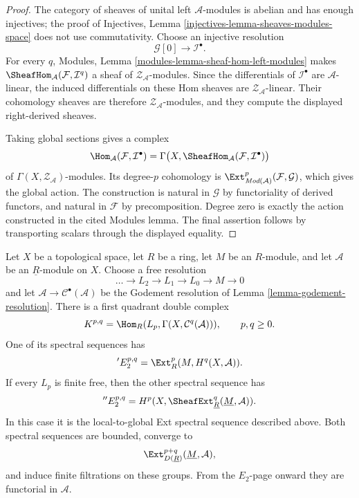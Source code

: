\begin{proof}
The category of sheaves of unital left $\mathcal A$-modules is abelian and
has enough injectives; the proof of Injectives, Lemma
\ref{injectives-lemma-sheaves-modules-space} does not use commutativity.
Choose an injective resolution
\[
\mathcal G[0]\longrightarrow\mathcal I^\bullet.
\]
For every $q$, Modules, Lemma
\ref{modules-lemma-sheaf-hom-left-modules} makes
$\SheafHom_{\mathcal A}(\mathcal F,\mathcal I^q)$ a sheaf of
$\mathcal Z_{\mathcal A}$-modules. Since the differentials of
$\mathcal I^\bullet$ are $\mathcal A$-linear, the induced differentials on
these Hom sheaves are $\mathcal Z_{\mathcal A}$-linear. Their cohomology
sheaves are therefore $\mathcal Z_{\mathcal A}$-modules, and they compute
the displayed right-derived sheaves.

Taking global sections gives a complex
\[
\Hom_{\mathcal A}(\mathcal F,\mathcal I^\bullet)
=
\Gamma\bigl(X,
\SheafHom_{\mathcal A}(\mathcal F,\mathcal I^\bullet)\bigr)
\]
of $\Gamma(X,\mathcal Z_{\mathcal A})$-modules. Its degree-$p$ cohomology is
$\Ext^p_{\textit{Mod}(\mathcal A)}(\mathcal F,\mathcal G)$, which gives the
global action. The construction is natural in $\mathcal G$ by functoriality
of derived functors, and natural in $\mathcal F$ by precomposition. Degree
zero is exactly the action constructed in the cited Modules lemma. The final
assertion follows by transporting scalars through the displayed equality.
\end{proof}


\begin{lemma}
\label{lemma-constant-sheaf-ext-double-complex}
\begin{reference}
\cite[Chapter IV, \S 4.3, Proposition 4.3.2, p. 191]{Tohoku}
\end{reference}
Let $X$ be a topological space, let $R$ be a ring, let $M$ be an
$R$-module, and let $\mathcal{A}$ be an $\underline{R}$-module on $X$.
Choose a free resolution
$$
\ldots \longrightarrow L_2 \longrightarrow L_1 \longrightarrow
L_0 \longrightarrow M \longrightarrow 0
$$
and let $\mathcal{A} \to \mathcal{C}^\bullet(\mathcal{A})$ be the
Godement resolution of Lemma \ref{lemma-godement-resolution}. There is a
first quadrant double complex
$$
K^{p, q} = \Hom_R(L_p, \Gamma(X, \mathcal{C}^q(\mathcal{A}))),
\qquad p, q \geq 0.
$$
One of its spectral sequences has
$$
{}'E_2^{p, q} = \Ext_R^p(M, H^q(X, \mathcal{A})).
$$
If every $L_p$ is finite free, then the other spectral sequence has
$$
{}''E_2^{p, q} =
H^p(X, \SheafExt^q_{\underline{R}}(\underline{M}, \mathcal{A})).
$$
In this case it is the local-to-global Ext spectral sequence described
above.
Both spectral sequences are bounded, converge to
$$
\Ext^{p + q}_{D(\underline{R})}(\underline{M}, \mathcal{A}),
$$
and induce finite filtrations on these groups. From the $E_2$-page onward
they are functorial in $\mathcal{A}$.
\end{lemma}


